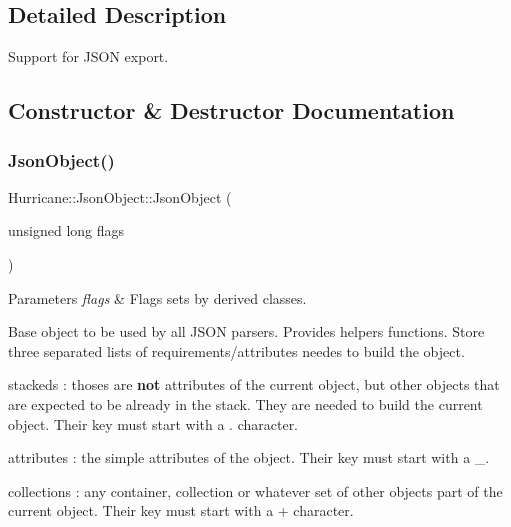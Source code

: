 \subsection{Detailed Description}
Support for J\+S\+ON export. 

\subsection{Constructor \& Destructor Documentation}
\mbox{\label{classHurricane_1_1JsonObject_a57d9c022204b30d4b253c2588f2c1215}} 
\subsubsection{\texorpdfstring{Json\+Object()}{JsonObject()}}
{\footnotesize\ttfamily Hurricane\+::\+Json\+Object\+::\+Json\+Object (\begin{DoxyParamCaption}\item[{unsigned long}]{flags }\end{DoxyParamCaption})}


\begin{DoxyParams}{Parameters}
{\em flags} & Flags sets by derived classes.\\
\hline
\end{DoxyParams}
Base object to be used by all J\+S\+ON parsers. Provides helpers functions. Store three separated lists of requirements/attributes needes to build the object.
\begin{DoxyItemize}
\item {\ttfamily stackeds} \+: thoses are {\bfseries not} attributes of the current object, but other objects that are expected to be already in the stack. They are needed to build the current object. Their key must start with a {\ttfamily \textquotesingle{}}.\textquotesingle{} character.
\item {\ttfamily attributes} \+: the simple attributes of the object. Their key must start with a {\ttfamily \textquotesingle{}\+\_\+\textquotesingle{}}.
\item {\ttfamily collections} \+: any container, collection or whatever set of other objects part of the current object. Their key must start with a {\ttfamily \textquotesingle{}+\textquotesingle{}} character.
\end{DoxyItemize}

